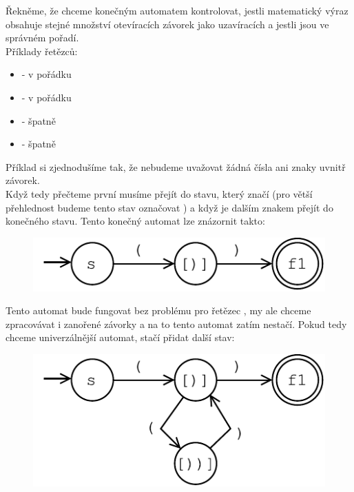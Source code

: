 \begin{exmp}
  \label{exmp:brackets}

  Řekněme, že chceme konečným automatem kontrolovat,
  jestli matematický výraz obsahuje stejné množství
  otevíracích závorek jako uzavíracích a jestli jsou ve správném pořadí.\\
  Příklady řetězců:
  \begin{itemize}
    \item \symb{(())} - v pořádku
    \item \symb{(()())} - v pořádku
    \item \symb{(()} - špatně
    \item \symb{)(} - špatně
  \end{itemize}

  Příklad si zjednodušíme tak, že nebudeme uvažovat žádná čísla ani znaky uvnitř
  závorek.\\

  Když tedy přečteme první \symb{(} musíme přejít do stavu, který značí
   (pro větší přehlednost budeme tento stav označovat \symb{[)]})
  a když je dalším znakem \symb{)} přejít do konečného stavu.
  Tento konečný automat lze znázornit takto:

  \begin{figure}[H]
    \centering
    \includegraphics{fig/finiteAutomat2.pdf}
  \end{figure}

  Tento automat bude fungovat bez problému pro řetězec \symb{()},
  my ale chceme zpracovávat i zanořené závorky a na to tento automat zatím nestačí.
  Pokud tedy chceme univerzálnější automat, stačí přidat další stav:

  \begin{figure}[H]
    \centering
    \includegraphics{fig/finiteAutomat2_1.pdf}
  \end{figure}


\end{exmp}
